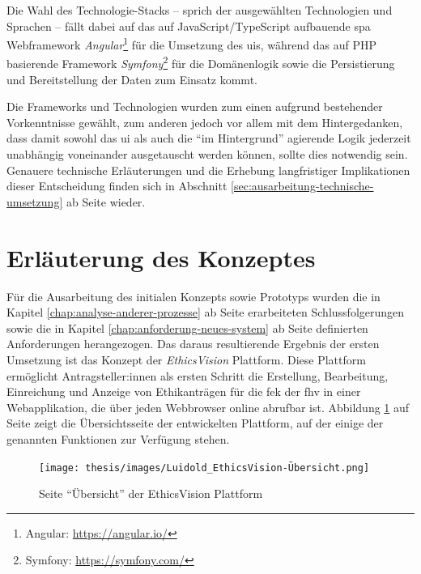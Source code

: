 \documentclass[a4paper,12pt,twoside,numbers=noendperiod]{scrreprt}
\begin{document}
\medskip

Die Wahl des Technologie-Stacks -- sprich der ausgewählten Technologien und Sprachen -- fällt dabei auf das auf JavaScript/TypeScript aufbauende \ac{spa} Webframework \textit{Angular}\footnote{Angular: \url{https://angular.io/}} für die Umsetzung des \aclp{ui}, während das auf PHP basierende Framework \textit{Symfony}\footnote{Symfony: \url{https://symfony.com/}} für die Domänenlogik sowie die Persistierung und Bereitstellung der Daten zum Einsatz kommt.

Die Frameworks und Technologien wurden zum einen aufgrund bestehender Vorkenntnisse gewählt, zum anderen jedoch vor allem mit dem Hintergedanken, dass damit sowohl das \ac{ui} als auch die \enquote{im Hintergrund} agierende Logik jederzeit unabhängig voneinander ausgetauscht werden können, sollte dies notwendig sein. Genauere technische Erläuterungen und die Erhebung langfristiger Implikationen dieser Entscheidung finden sich in Abschnitt \ref{sec:ausarbeitung-technische-umsetzung} ab Seite \pageref{sec:ausarbeitung-technische-umsetzung} wieder.

\section{Erläuterung des Konzeptes}
\label{sec:erläuterung-konzept}

Für die Ausarbeitung des initialen Konzepts sowie Prototyps wurden die in Kapitel \ref{chap:analyse-anderer-prozesse} ab Seite \pageref{chap:analyse-anderer-prozesse} erarbeiteten Schlussfolgerungen sowie die in Kapitel \ref{chap:anforderung-neues-system} ab Seite \pageref{chap:anforderung-neues-system} definierten Anforderungen herangezogen. Das daraus resultierende Ergebnis der ersten Umsetzung ist das Konzept der \textit{EthicsVision} Plattform. Diese Plattform ermöglicht Antragsteller:innen als ersten Schritt die Erstellung, Bearbeitung, Einreichung und Anzeige von Ethikanträgen für die \acl{fek} der \acl{fhv} in einer Webapplikation, die über jeden Webbrowser online abrufbar ist. Abbildung \ref{fig:ethics-vision-übersicht} auf Seite \pageref{fig:ethics-vision-übersicht} zeigt die Übersichtsseite der entwickelten Plattform, auf der einige der genannten Funktionen zur Verfügung stehen.

\begin{figure}[ht]
    \centering
    \texttt{[image: thesis/images/Luidold\_EthicsVision-Übersicht.png]}
    \caption{Seite \enquote{Übersicht} der EthicsVision Plattform}
    \label{fig:ethics-vision-übersicht}
\end{figure}
\end{document}

